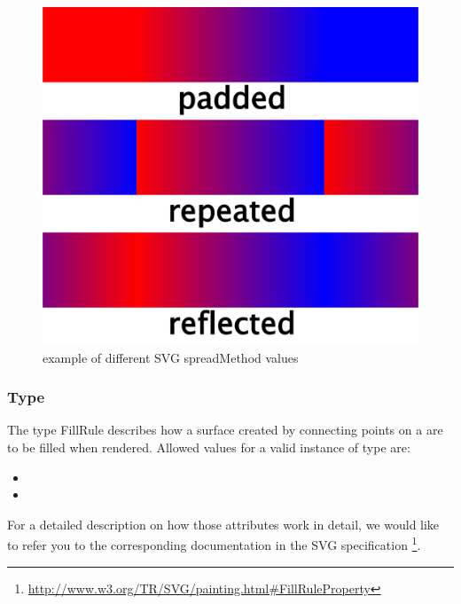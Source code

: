 \begin{figure}[!ht]
\begin{center}
\includegraphics[scale=0.18]{figures/SVG_spreadMethod.png}
\end{center}
\caption{example of different SVG spreadMethod values}
\label{SVG:spreadMethod}
\end{figure}

\subsubsection{Type \fixttspace{}}

The type FillRule describes how a surface created by connecting 
points on a \Polygon are to be filled when rendered. Allowed values for a valid instance of type  are:

\begin{itemize}
 \item {} 
 \item {}
\end{itemize}

For a detailed description on how those attributes work in detail, we would like to refer you to the corresponding documentation in the SVG specification  \footnote{ \url{http://www.w3.org/TR/SVG/painting.html\#FillRuleProperty} }. 

